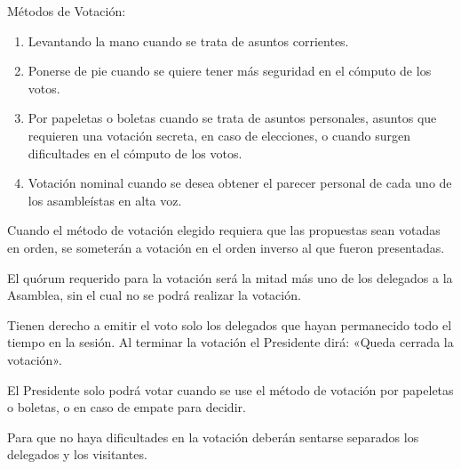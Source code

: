 \article
Métodos de Votación:
\begin{enumerate}
    \item Levantando la mano cuando se trata de asuntos corrientes.
    \item Ponerse de pie cuando se quiere tener más seguridad en el cómputo de los votos.
    \item Por papeletas o boletas cuando se trata de asuntos personales, asuntos que requieren una votación secreta, en caso de elecciones, o cuando surgen dificultades en el cómputo de los votos.
    \item Votación nominal cuando se desea obtener el parecer personal de cada uno de los asambleístas en alta voz.
\end{enumerate}
Cuando el método de votación elegido requiera que las propuestas sean votadas en orden, se someterán a votación en el orden inverso al que fueron presentadas.

\article
El quórum requerido para la votación será la mitad más uno de los delegados a la Asamblea, sin el cual no se podrá realizar la votación.

\article
Tienen derecho a emitir el voto solo los delegados que hayan permanecido todo el tiempo en la sesión. Al terminar la votación el Presidente dirá: «Queda cerrada la votación».

\article
El Presidente solo podrá votar cuando se use el método de votación por papeletas o boletas, o en caso de empate para decidir.

\article
Para que no haya dificultades en la votación deberán sentarse separados los delegados y los visitantes.

\label{votaciones-final}
